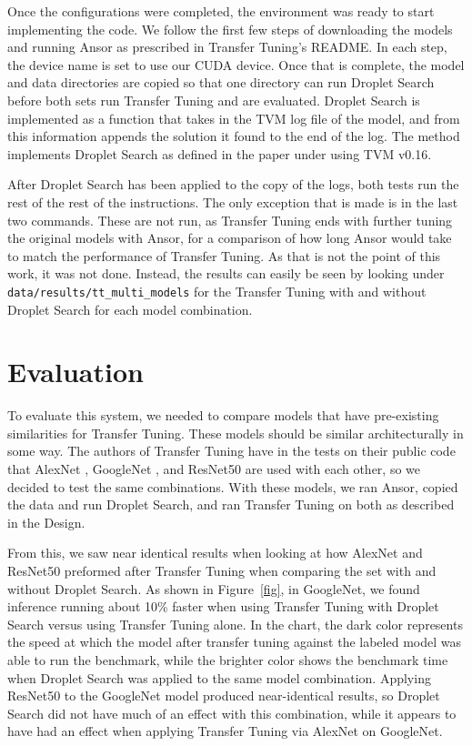 \documentclass[conference]{IEEEtran}
\begin{document}
Once the configurations were completed, the environment was ready to start implementing the code. We follow the first few steps of downloading the models and running Ansor as prescribed in Transfer Tuning's README. In each step, the device name is set to use our CUDA device. Once that is complete, the model and data directories are copied so that one directory can run Droplet Search before both sets run Transfer Tuning and are evaluated. Droplet Search is implemented as a function that takes in the TVM log file of the model, and from this information appends the solution it found to the end of the log. The method implements Droplet Search as defined in the paper under using TVM v0.16. 

After Droplet Search has been applied to the copy of the logs, both tests run the rest of the rest of the instructions. The only exception that is made is in the last two commands. These are not run, as Transfer Tuning ends with further tuning the original models with Ansor, for a comparison of how long Ansor would take to match the performance of Transfer Tuning. As that is not the point of this work, it was not done. Instead, the results can easily be seen by looking under \lstinline{data/results/tt_multi_models} for the Transfer Tuning with and without Droplet Search for each model combination.  

\section{Evaluation}
To evaluate this system, we needed to compare models that have pre-existing similarities for Transfer Tuning. These models should be similar architecturally in some way. The authors of Transfer Tuning have in the tests on their public code that AlexNet \cite{krizhevsky_imagenet_2012}, GoogleNet \cite{szegedy_going_2015}, and ResNet50 \cite{he_deep_2015} are used with each other, so we decided to test the same combinations. With these models, we ran Ansor, copied the data and run Droplet Search, and ran Transfer Tuning on both as described in the Design. 

From this, we saw near identical results when looking at how AlexNet and ResNet50 preformed after Transfer Tuning when comparing the set with and without Droplet Search. As shown in Figure~\ref{fig}, in GoogleNet, we found inference running about 10\% faster when using Transfer Tuning with Droplet Search versus using Transfer Tuning alone. In the chart, the dark color represents the speed at which the model after transfer tuning against the labeled model was able to run the benchmark, while the brighter color shows the benchmark time when Droplet Search was applied to the same model combination. Applying ResNet50 to the GoogleNet model produced near-identical results, so Droplet Search did not have much of an effect with this combination, while it appears to have had an effect when applying Transfer Tuning via AlexNet on GoogleNet.
\end{document}
